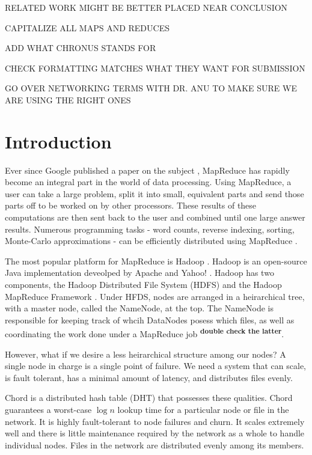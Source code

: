\documentclass[conference, compsocconf, letterpaper]{IEEEtran}
\begin{document}
RELATED WORK MIGHT BE BETTER PLACED NEAR CONCLUSION

CAPITALIZE ALL MAPS AND REDUCES

ADD WHAT CHRONUS STANDS FOR

CHECK FORMATTING MATCHES WHAT THEY WANT FOR SUBMISSION

GO OVER NETWORKING TERMS WITH DR. ANU TO MAKE SURE WE ARE USING THE RIGHT ONES

\section{Introduction}

Ever since Google published a paper on the subject \cite{mapreduce}, MapReduce has rapidly become an integral part in the world of data processing.  Using MapReduce, a user can take a large problem, split it into small, equivalent parts and send those parts off to be worked on by other processors.  These results of these computations are then sent back to the user and combined until one large answer results.  Numerous programming tasks - word counts, reverse indexing, sorting, Monte-Carlo approximations - can be efficiently distributed using MapReduce \cite{mapreduce}.

The most popular platform for MapReduce is Hadoop \cite{Hadoop}. Hadoop is an open-source Java implementation deveolped by Apache and Yahoo! \cite{pavlo2009comparison}.  Hadoop has two components, the Hadoop Distributed File System (HDFS) and the Hadoop MapReduce Framework \cite{mrsurvey}.  Under HFDS, nodes are arranged in a heirarchical tree, with a master node, called the NameNode, at the top.  The NameNode is responsible for keeping track of whcih DataNodes posess which files, as well as coordinating the work done under a MapReduce job \textsuperscript{\textbf{double check the latter}}. 
 
However, what if we desire a less heirarchical structure among our nodes?  A single node in charge is a single point of failure.  We need a system that can scale, is fault tolerant, has a minimal amount of latency, and distributes files evenly. 

Chord \cite{Chord} is a distributed hash table (DHT) that possesses these qualities.  Chord guarantees a worst-case $\log n$ lookup time for a particular node or file in the network. It is highly fault-tolerant to node failures and churn.  It scales extremely well and there is little maintenance required by the network as a whole to handle individual nodes.  Files in the network are distributed evenly among its members.
 
\end{document}
